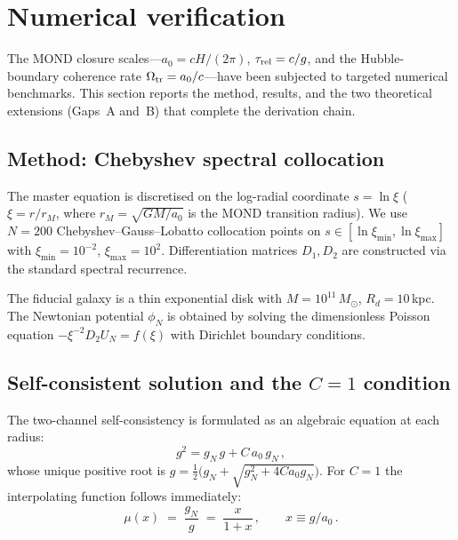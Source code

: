 \documentclass[11pt]{article}
\begin{document}
\section{Numerical verification}
\label{sec:numerical_verification}

The MOND closure scales---$a_0=cH/(2\pi)$,
$\tau_{\rm rel}=c/g$, and the Hubble-boundary coherence rate
$\Omega_{\rm tr}=a_0/c$---have been subjected to targeted
numerical benchmarks.
This section reports the method, results, and the two
theoretical extensions (Gaps~A and~B) that complete the
derivation chain.

\subsection{Method: Chebyshev spectral collocation}
\label{sec:num_method}

The master equation is discretised on the log-radial coordinate
$s=\ln\xi$ ($\xi=r/r_M$, where $r_M=\sqrt{GM/a_0}$ is the MOND
transition radius).  We use $N=200$ Chebyshev--Gauss--Lobatto
collocation points on $s\in[\ln\xi_{\min},\ln\xi_{\max}]$ with
$\xi_{\min}=10^{-2}$, $\xi_{\max}=10^{2}$.  Differentiation
matrices $D_1,D_2$ are constructed via the standard spectral
recurrence.

The fiducial galaxy is a thin exponential disk with
$M=10^{11}\,M_\odot$, $R_d=10\,$kpc.  The Newtonian
potential $\phi_N$ is obtained by solving the dimensionless
Poisson equation $-\xi^{-2}D_2 U_N = f(\xi)$ with Dirichlet
boundary conditions.

\subsection[Self-consistent solution and the C equals 1 condition]{Self-consistent solution and the $C=1$ condition}
\label{sec:self_consist}

The two-channel self-consistency is formulated as an
algebraic equation at each radius:
\begin{equation}\label{eq:quadratic}
  g^2 = g_N\,g + C\,a_0\,g_N\,,
\end{equation}
whose unique positive root is
$g = \tfrac12\bigl(g_N+\sqrt{g_N^2+4Ca_0 g_N}\bigr)$.
For $C=1$ the interpolating function follows immediately:
\begin{equation}\label{eq:mu_from_quadratic}
  \mu(x) \;=\; \frac{g_N}{g} \;=\; \frac{x}{1+x}\,,
  \qquad x\equiv g/a_0\,.
\end{equation}
\end{document}
